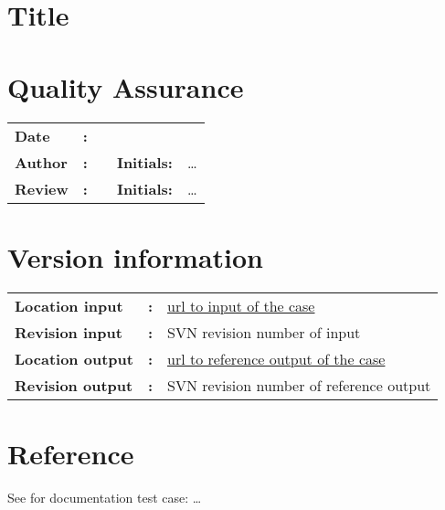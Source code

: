 

\section{Title}
\newrefsegment

\section*{Quality Assurance}
\begin{tabular}{@{}p{27mm}@{}p{0mm}p{\textwidth-52mm-48pt}p{15mm}p{10mm}}
\textbf{Date} & \textbf{:} &   \\ 
\textbf{Author} & \textbf{:} &   & \textbf{Initials:} & \ldots \\
\textbf{Review} & \textbf{:} &   & \textbf{Initials:} & \ldots 
\end{tabular}

\section*{Version information}
{{
\begin{tabular}{@{}p{27mm}@{}p{0mm}p{\textwidth-27mm-24pt}}
\textbf{Location input}     & \textbf{:} & \url{url to input of the case} \\
\textbf{Revision input} & \textbf{:} & SVN revision number of input \\
\textbf{Location output}     & \textbf{:} & \url{url to reference output of the case} \\
\textbf{Revision output} & \textbf{:} & SVN revision number of reference output
\end{tabular}
}}

\section*{Reference}
See for documentation test case: \ldots

\printrefsegment
